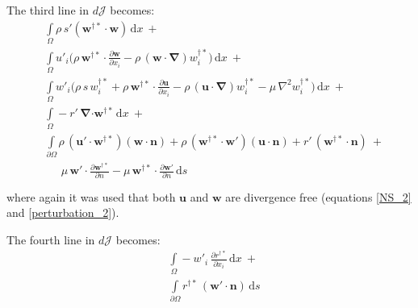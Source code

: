 \documentclass[12pt, a4paper]{article}
\begin{document}
The third line in $d \mathcal{J}$ becomes:
\begin{equation}
\begin{split}
&\int\limits_{\Omega}
\rho \, s' (\mathbf{w^{\dagger *} \cdot w})
\, \mathrm{d} x \ + \\
&\int\limits_{\Omega} u'_i \bigg( 
\rho \, \mathbf{w^{\dagger *} \cdot} \frac{\partial \mathbf{w}}{\partial x_i} - 
\rho \, (\mathbf{w \cdot} \boldsymbol{\nabla}) w^{\dagger *}_i
\bigg) \, \mathrm{d} x \ + \\
&\int\limits_{\Omega} w'_i \bigg( 
\rho \, s \, w^{\dagger *}_i + 
\rho \, \mathbf{w^{\dagger *} \cdot} \frac{\partial \mathbf{u}}{\partial x_i} - 
\rho \, (\mathbf{u \cdot} \boldsymbol{\nabla}) w^{\dagger *}_i - 
\mu \, \nabla^2 w^{\dagger *}_i
\bigg) \, \mathrm{d} x \ + \\
&\int\limits_{\Omega}
- r' \, \boldsymbol{\nabla} \mathbf{\cdot w^{\dagger *}}
\, \mathrm{d} x \ + \\
&\int\limits_{\partial \Omega}
\rho \, (\mathbf{u' \cdot w^{\dagger *}}) (\mathbf{w \cdot n}) + 
\rho \, (\mathbf{w^{\dagger *} \cdot w'}) (\mathbf{u \cdot n}) + 
r' \, (\mathbf{w^{\dagger *} \cdot n}) \ + \\
& \phantom{\int\limits_{\partial \Omega} \ }
\mu \, \mathbf{w' \cdot} \frac{\partial \mathbf{w^{\dagger *}}}{\partial n} - 
\mu \, \mathbf{w^{\dagger *} \cdot} \frac{\partial \mathbf{w'}}{\partial n}
\, \mathrm{d} s
\end{split}
\end{equation}
where again it was used that both $\mathbf{u}$ and $\mathbf{w}$ are divergence free (equations \ref{NS_2} and \ref{perturbation_2}).

The fourth line in $d \mathcal{J}$ becomes:
\begin{equation}
\begin{split}
&\int\limits_{\Omega}
- w'_i \, \frac{\partial r^{\dagger *}}{\partial x_i}
\, \mathrm{d} x \ + \\
&\int\limits_{\partial \Omega}
r^{\dagger *} \, (\mathbf{w' \cdot n})
\, \mathrm{d} s
\end{split}
\end{equation}
\end{document}
